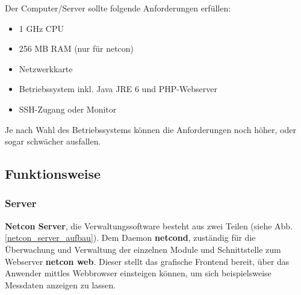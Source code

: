 \documentclass[a4paper,14pt,headsepline]{scrartcl}
\begin{document}
Der Computer/Server sollte folgende Anforderungen  erfüllen:

\begin{itemize}

\item 1 GHz CPU
\item 256 MB RAM (nur für netcon)
\item Netzwerkkarte
\item Betriebssystem inkl. Java JRE 6 und PHP-Webserver
\item SSH-Zugang oder Monitor

\end{itemize}

Je nach Wahl des Betriebssystems können die Anforderungen noch höher, oder sogar schwächer ausfallen.


\newpage
\subsection{Funktionsweise}

\subsubsection{Server}

\textbf{Netcon Server}, die Verwaltungssoftware besteht aus zwei Teilen (siehe Abb. \ref{netcon_server_aufbau}). Dem Daemon \textbf{netcond}, zuständig für die Überwachung und Verwaltung der einzelnen Module und Schnittstelle zum Webserver \textbf{netcon web}. Dieser stellt das grafische Frontend bereit, über das Anwender mittles Webbrowser einsteigen können, um sich beispielsweise Messdaten anzeigen zu lassen. 

\begin{figure}[h]
\begin{center}
\end{center}
\end{figure}
\end{document}

